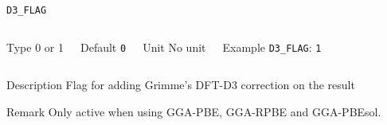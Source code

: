 \begin{frame}[allowframebreaks]{\texttt{D3\_FLAG}} \label{D3_FLAG}
\vspace*{-12pt}
\begin{columns}
\begin{block}{Type}
0 or 1
\end{block}

\begin{block}{Default}
\texttt{0}
\end{block}

\begin{block}{Unit}
No unit
\end{block}

\begin{block}{Example}
\texttt{D3\_FLAG}: \texttt{1}
\end{block}
\end{columns}

\begin{block}{Description}
Flag for adding Grimme's DFT-D3 correction on the result
\end{block}

\begin{block}{Remark}
Only active when using GGA-PBE, GGA-RPBE and GGA-PBEsol.
\end{block}

\end{frame}


